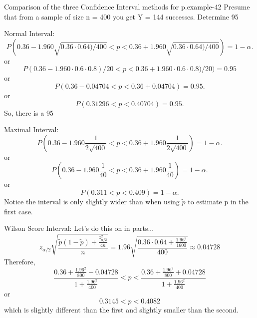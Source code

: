 \documentclass[10pt,]{book}
\numberwithin{equation}{section}
\newcommand{\lt}{<}
\begin{document}
 \begin{example}{Comparison of the three Confidence Interval methods for p.}{example-42}%
\hypertarget{p-1123}{}%
Presume that from a sample of size n = 400 you get Y = 144 successes.  Determine 95%
\par
\hypertarget{p-1124}{}%
Normal Interval:%
\begin{equation*}
P( 0.36 - 1.960 \sqrt{0.36 \cdot 0.64) / 400} \lt  p \lt 0.36 + 1.960 \sqrt{0.36 \cdot 0.64) / 400}) = 1 - \alpha.
\end{equation*}
or%
\begin{equation*}
P( 0.36 - 1.960 \cdot 0.6 \cdot 0.8) / 20 \lt  p \lt 0.36 + 1.960 \cdot 0.6 \cdot 0.8) / 20) = 0.95 
\end{equation*}
or%
\begin{equation*}
P( 0.36 - 0.04704 \lt  p \lt 0.36 + 0.04704) = 0.95 .
\end{equation*}
or%
\begin{equation*}
P( 0.31296 \lt  p \lt 0.40704) = 0.95 .
\end{equation*}
So, there is a 95%
\par
\hypertarget{p-1125}{}%
Maximal Interval:%
\begin{equation*}
P( 0.36 - 1.960 \frac{1}{2\sqrt{400}} \lt  p \lt 0.36 + 1.960 \frac{1}{2\sqrt{400}} ) = 1 - \alpha.
\end{equation*}
or%
\begin{equation*}
P( 0.36 - 1.960 \frac{1}{40} \lt  p \lt 0.36 + 1.960 \frac{1}{40} ) = 1 - \alpha.
\end{equation*}
or%
\begin{equation*}
P( 0.311 \lt  p \lt 0.409 ) = 1 - \alpha.
\end{equation*}
Notice the interval is only slightly wider than when using \(\tilde{p}\) to estimate p in the first case.%
\par
\hypertarget{p-1126}{}%
Wilson Score Interval:  Let's do this on in parts...%
\begin{equation*}
z_{\alpha/2} \sqrt{\frac{\tilde{p}(1-\tilde{p}) + \frac{z_{\alpha/2}^2}{4n}}{n}} = 1.96 \sqrt{ \frac{0.36 \cdot 0.64 + \frac{1.96^2}{1600}}{400}} \approx 0.04728
\end{equation*}
Therefore,%
\begin{equation*}
\frac{0.36 + \frac{1.96^2}{800} - 0.04728}{1 + \frac{1.96^2}{400}} \lt p \lt \frac{0.36 + \frac{1.96^2}{800} + 0.04728}{1 + \frac{1.96^2}{400}}
\end{equation*}
or%
\begin{equation*}
0.3145 \lt p \lt 0.4082
\end{equation*}
which is slightly different than the first and slightly smaller than the second.%
\end{example}
\end{document}
